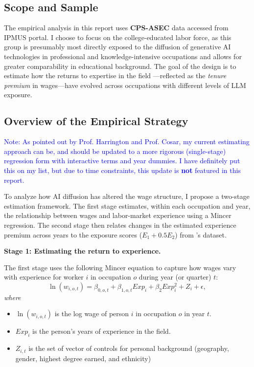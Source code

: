 \documentclass[12pt]{article}
\begin{document}
\subsection{Scope and Sample}
The empirical analysis in this report uses \textbf{CPS-ASEC} data accessed from IPMUS portal. I choose to focus on the college-educated labor force, as this group is presumably most directly exposed to the diffusion of generative AI technologies in professional and knowledge-intensive occupations and allows for greater comparability in educational background. The goal of the design is to estimate how the returns to expertise in the field —reflected as the \textit{tenure premium} in wages—have evolved across occupations with different levels of LLM exposure.

\subsection{Overview of the Empirical Strategy}

\textcolor{blue}{Note: As pointed out by Prof. Harrington and Prof. Cosar, my current estimating approach can be, and should be updated to a more rigorous (single-stage) regression form with interactive terms and year dummies. I have definitely put this on my list, but due to time constraints, this update is \textbf{not} featured in this report.}


To analyze how AI diffusion has altered the wage structure, I propose a two-stage estimation framework. The first stage estimates, within each occupation and year, the relationship between wages and labor-market experience using a Mincer regression. The second stage then relates changes in the estimated experience premium across years to the exposure scores ($E_1+0.5E_2$) from \textbf{\cite{eloundou2024gpts}}'s dataset.

\medskip

\noindent \textbf{Stage 1: Estimating the return to experience.}  

The first stage uses the following Mincer equation to capture how wages vary with experience for worker $i$ in occupation $o$ during year (or quarter) $t$:
\[
\ln(w_{i,o,t}) = \beta_{0,o,t} + \beta_{1,o,t} Exp_{i} + \beta_2 Exp_{i}^2 + Z_{i} + \epsilon,
\]
\textit{where}
\begin{itemize}
    \item $\ln(w_{i,o,t})$ is the log wage of person $i$ in occupation $o$ in year $t$.
    \item $Exp_i$ is the person's years of experience in the field. 
    \item $Z_{i,t}$ is the set of vector of controls for personal background (geography, gender, highest degree earned, and ethnicity) 
\end{itemize}
\end{document}
